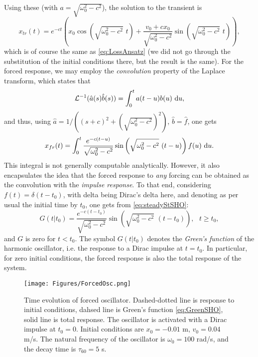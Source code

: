Using these (with $a = \sqrt{\omega_0^2-c^2}$), the solution to the transient is
\begin{equation}
    x_{tr}(t) = e^{-ct}\left(x_0 \cos\left(\sqrt{\omega_0^2-c^2}\,\,t\right) + \frac{v_0 + c x_0}{\sqrt{\omega_0^2-c^2}}\sin\left(\sqrt{\omega_0^2-c^2}\,\,t\right)\right),
\end{equation}
which is of course the same as \eqref{eq:LossAnsatz} (we did not go through the substitution of the initial conditions there, but the result is the same). For the forced response, we may employ the \emph{convolution} property of the Laplace transform, which states that
\begin{equation}
    \mathcal{L}^{-1}(\hat a(s)\hat b(s)) = \int_{0}^t a(t-u)b(u) \, \mathop{}\!\mathrm{d} u,
\end{equation}
and thus, using $\hat a = 1/((s+c)^2 + (\sqrt{\omega_0^2-c^2})^2)$, $\hat b = \hat f$, one gets
\begin{equation}\label{eq:steadyStSHO}
    x_{fr}(t) = \int_0^t \frac{e^{-c(t-u)}}{\sqrt{\omega_0^2-c^2}}\sin\left(\sqrt{\omega_0^2-c^2}\,\,(t-u)\right) f(u) \, \mathop{}\!\mathrm{d} u. 
\end{equation}
This integral is not generally computable analytically. However, it also encapsulates the idea that the forced response to \emph{any} forcing can be obtained as the convolution with the \emph{impulse response}. To that end, considering $f(t)=\delta(t-t_0)$, with delta being Dirac's delta here, and denoting as per usual the initial time by $t_0$, one gets from \eqref{eq:steadyStSHO}:
\begin{equation}\label{eq:GreenSHO}
    G(t|t_0) = \frac{e^{-c(t-t_0)}}{\sqrt{\omega_0^2-c^2}}\sin\left(\sqrt{\omega_0^2-c^2}\,\,(t-t_0)\right), \,\,\,\, t\geq t_0,
\end{equation}
and $G$ is zero for $t<t_0$. The symbol $G(t|t_0)$ denotes the \emph{Green's function} of the harmonic oscillator, i.e. the  response to a Dirac impulse at $t=t_0$. In particular, for zero initial conditions, the forced response is also the total response of the system. 
\begin{figure}
    \centering
    \texttt{[image: Figures/ForcedOsc.png]}
    \caption{Time evolution of forced oscillator. Dashed-dotted line is response to initial conditions, dahsed line is Green's function \eqref{eq:GreenSHO}, solid line is total response. The oscillator is activated with a Dirac impulse at $t_0=0$. Initial conditions are $x_0=-0.01$ m, $v_0=0.04$ m/s. The natural frequency of the oscillator is $\omega_0 = 100$ rad/s, and the decay time is $\tau_{60} = 5$ s.}
\end{figure}


